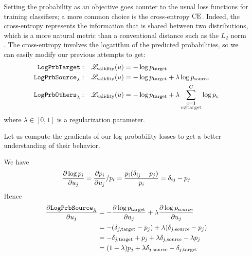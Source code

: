 \documentclass[../main.tex]{subfiles}
\begin{document}
Setting the probability as an objective goes counter to the usual loss functions for training classifiers; a more common choice is the cross-entropy $\text{CE}$.
Indeed, the cross-entropy represents the information that is shared between two distributions, which is a more natural metric than a conventional distance such as the $L_2$ norm \cite{murphyMachine2012}.
The cross-entropy involves the logarithm of the predicted probabilities, so we can easily modify our previous attempts to get:
\begin{align*}
    \mathtt{LogPrbTarget}{}:        & \quad    \mathscr{L}_\text{validity}(u) = - \log p_{\mathrm{target}}                              \\
    \mathtt{LogPrbSource}_{\lambda}: & \quad     \mathscr{L}_\text{validity}(u) = - \log p_{\mathrm{target}} + \lambda \log p_{\mathrm{source}}    \\
    \mathtt{LogPrbOthers}_{\lambda}: & \quad    \mathscr{L}_\text{validity}(u) = - \log p_{\mathrm{target}} + \lambda \sum_{\substack{{c}=1 \\ {c} \neq \mathrm{target}}}^C \log p_c
\end{align*}
where $\lambda \in [0, 1]$ is a regularization parameter.

Let us compute the gradients of our log-probability losses to get a better understanding of their behavior.

We have
\begin{align*}
    \frac{\partial \log p_i}{\partial u_j}
= \frac{\partial p_i}{\partial u_j} / p_i
= \frac{p_i (\delta_{ij} - p_j) }{p_i}
= \delta_{ij} - p_j
\end{align*}
Hence
\begin{align*}
    \frac{\partial \mathtt{LogPrbSource}_{\lambda}}{\partial u_j}
     & = - \frac{\partial \log p_{\mathrm{target}}}{\partial u_j} + \lambda \frac{\partial \log p_{\mathrm{source}}}{\partial u_j} \\
     & = - (\delta_{j, \mathrm{target}} - p_j) + \lambda (\delta_{j, \mathrm{source}} - p_j)                             \\
     & = - \delta_{j, \mathrm{target}} + p_j + \lambda \delta_{j, \mathrm{source}} - \lambda p_j                         \\
     & = (1 - \lambda) p_j + \lambda \delta_{j, \mathrm{source}} - \delta_{j, \mathrm{target}}
\end{align*}
\end{document}
